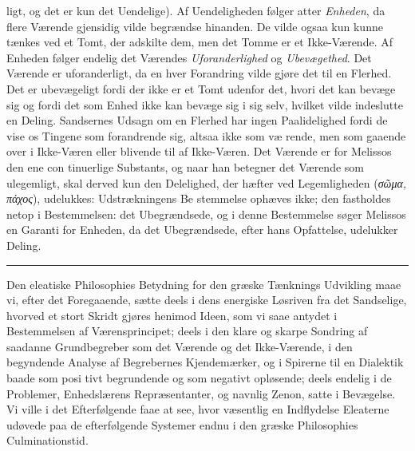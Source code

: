 \documentclass[12pt,a4paper]{book}
\newcommand{\divrule}{\begin{center}\rule{2cm}{0.4pt}\end{center}}
\newcommand{\gk}[1]{\textit{#1}}
\begin{document}
ligt, og det er kun det Uendelige). Af Uendeligheden følger
atter \emph{Enheden}, da flere Værende gjensidig vilde begrændse
hinanden. De vilde ogsaa kun kunne tænkes ved et Tomt,
der adskilte dem, men det Tomme er et Ikke-Værende. Af
Enheden følger endelig det Værendes \emph{Uforanderlighed}
og \emph{Ubevægethed}. Det Værende er uforanderligt, da en\-%
hver Forandring vilde gjøre det til en Flerhed. Det er
ubevægeligt fordi der ikke er et Tomt udenfor det, hvori det
kan bevæge sig og fordi det som Enhed ikke kan bevæge sig
i sig selv, hvilket vilde indeslutte en Deling. Sandsernes
Udsagn om en Flerhed har ingen Paalidelighed fordi de
vise os Tingene som forandrende sig, altsaa ikke som væ\-%
rende, men som gaaende over i Ikke-Væren eller blivende
til af Ikke-Væren. Det Værende er for Melissos den ene con\-%
tinuerlige Substants, og naar han betegner det Værende som
ulegemligt, skal derved kun den Delelighed, der hæfter ved
Legemligheden (\gk{σῶμα, πάχος}), udelukkes: Udstrækningens Be\-%
stemmelse ophæves ikke; den fastholdes netop i Bestemmelsen:
det Ubegrændsede, og i denne Bestemmelse søger Melissos
en Garanti for Enheden, da det Ubegrændsede, efter hans
Opfattelse, udelukker Deling.
\divrule
Den eleatiske Philosophies Betydning for den græske
Tænknings Udvikling maae vi, efter det Foregaaende, sætte
deels i dens energiske Løsriven fra det Sandselige, hvorved
et stort Skridt gjøres henimod Ideen, som vi saae antydet i
Bestemmelsen af Værensprincipet; deels i den klare og skarpe
Sondring af saadanne Grundbegreber som det Værende og det
Ikke-Værende, i den begyndende Analyse af Begrebernes
Kjendemærker, og i Spirerne til en Dialektik baade som posi\-%
tivt begrundende og som negativt opløsende; deels endelig i
de Problemer, Enhedslærens Repræsentanter, og navnlig Zenon,
satte i Bevægelse. Vi ville i det Efterfølgende faae at see, hvor
væsentlig en Indflydelse Eleaterne udøvede paa de efterfølgende
Systemer endnu i den græske Philosophies Culminationstid.
\end{document}
